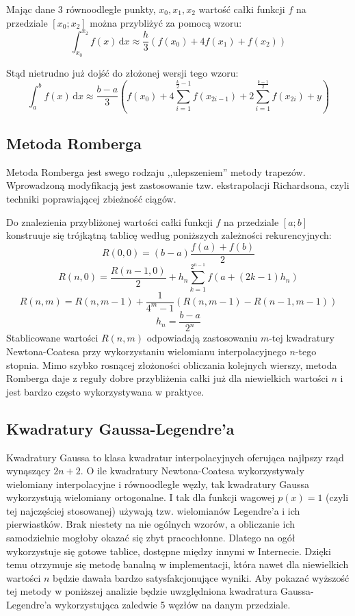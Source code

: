 \documentclass[11pt,leqno]{article}
\begin{document}
Mając dane 3 równoodległe punkty, $x_0, x_1, x_2$ wartość całki funkcji $f$ na przedziale $[x_0; x_2]$ można przybliżyć za pomocą wzoru:
\[
  \int_{x_0}^{x_2} f(x) \,\mathrm{d}x
\approx
  \frac{h}{3} \left( f(x_0) + 4f(x_1) + f(x_2) \right)
\]

Stąd nietrudno już dojść do złożonej wersji tego wzoru:
\[
  \int_{a}^{b} f(x) \,\mathrm{d}x
\approx
  \frac{b - a}{3} \left(
      f(x_0)
    +
      4 \sum_{i = 1}^{\frac{k}{2} - 1} f(x_{2i - 1})
    +
      2 \sum_{i = 1}^{\frac{k - 1}{2}} f(x_{2i}) + y
  \right)
\]

\subsection{Metoda Romberga}
Metoda Romberga jest swego rodzaju ,,ulepszeniem'' metody trapezów. Wprowadzoną modyfikacją jest zastosowanie tzw. ekstrapolacji Richardsona, czyli techniki poprawiającej zbieżność ciągów.

Do znalezienia przybliżonej wartości całki funkcji $f$ na przedziale $[a; b]$ konstruuje się trójkątną tablicę według poniższych zależności rekurencyjnych:
\[
  R(0, 0) = (b - a)\frac{f(a) + f(b)}{2}
\]
\[
  R(n, 0) = \frac{R(n - 1, 0)}{2} + h_n \sum_{k = 1}^{2^{n - 1}}
    f(a + (2k - 1)h_n)
\]
\[
  R(n, m) = R(n, m - 1) + \frac{1}{4^m - 1}
  \left(
    R(n, m - 1) - R(n - 1, m - 1)
  \right)
\]
\[
  h_n = \frac{b - a}{2^n}
\]
Stablicowane wartości $R(n, m)$ odpowiadają zastosowaniu $m$-tej kwadratury Newtona-Coatesa przy wykorzystaniu wielomianu interpolacyjnego $n$-tego stopnia. Mimo szybko rosnącej złożoności obliczania kolejnych wierszy, metoda Romberga daje z reguły dobre przybliżenia całki już dla niewielkich wartości $n$ i jest bardzo często wykorzystywana w praktyce.


\subsection{Kwadratury Gaussa-Legendre'a}
Kwadratury Gaussa to klasa kwadratur interpolacyjnych oferująca najlpszy rząd wynąszący $2n + 2$. O ile kwadratury Newtona-Coatesa wykorzystywały wielomiany interpolacyjne i równoodległe węzły, tak kwadratury Gaussa wykorzystują wielomiany ortogonalne. I tak dla funkcji wagowej $p(x) = 1$ (czyli tej najczęściej stosowanej) używają tzw. wielomianów Legendre'a i ich pierwiastków. Brak niestety na nie ogólnych wzorów, a obliczanie ich samodzielnie mogłoby okazać się zbyt pracochłonne. Dlatego na ogół wykorzystuje się gotowe tablice, dostępne między innymi w Internecie. Dzięki temu otrzymuje się metodę banalną w implementacji, która nawet dla niewielkich wartości $n$ będzie dawała bardzo satysfakcjonujące wyniki. Aby pokazać wyższość tej metody w poniższej analizie będzie uwzględniona kwadratura Gaussa-Legendre'a wykorzystująca zaledwie 5 węzłów na danym przedziale.
\end{document}
